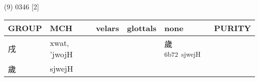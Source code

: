 \documentclass[14pt,a4paper]{scrartcl}
\begin{document}
(9) 0346 {[}2{]}

\begin{longtable}[c]{@{}llllll@{}}
\toprule
\begin{minipage}[b]{0.14\columnwidth}\raggedright\strut
GROUP
\strut\end{minipage} &
\begin{minipage}[b]{0.14\columnwidth}\raggedright\strut
MCH
\strut\end{minipage} &
\begin{minipage}[b]{0.14\columnwidth}\raggedright\strut
velars
\strut\end{minipage} &
\begin{minipage}[b]{0.14\columnwidth}\raggedright\strut
glottals
\strut\end{minipage} &
\begin{minipage}[b]{0.14\columnwidth}\raggedright\strut
none
\strut\end{minipage} &
\begin{minipage}[b]{0.14\columnwidth}\raggedright\strut
PURITY
\strut\end{minipage}\tabularnewline
\midrule
\endhead
\begin{minipage}[t]{0.14\columnwidth}\raggedright\strut
戌
\strut\end{minipage} &
\begin{minipage}[t]{0.14\columnwidth}\raggedright\strut
xwat, 'jwojH
\strut\end{minipage} &
\begin{minipage}[t]{0.14\columnwidth}\raggedright\strut
\strut\end{minipage} &
\begin{minipage}[t]{0.14\columnwidth}\raggedright\strut
\strut\end{minipage} &
\begin{minipage}[t]{0.14\columnwidth}\raggedright\strut
歲\textsuperscript{6b72~sjwejH}
\strut\end{minipage} &
\begin{minipage}[t]{0.14\columnwidth}\raggedright\strut
\strut\end{minipage}\tabularnewline
\begin{minipage}[t]{0.14\columnwidth}\raggedright\strut
歲
\strut\end{minipage} &
\begin{minipage}[t]{0.14\columnwidth}\raggedright\strut
sjwejH
\strut\end{minipage} &
\begin{minipage}[t]{0.14\columnwidth}\raggedright\strut

\end{minipage}
\end{longtable}
\end{document}
